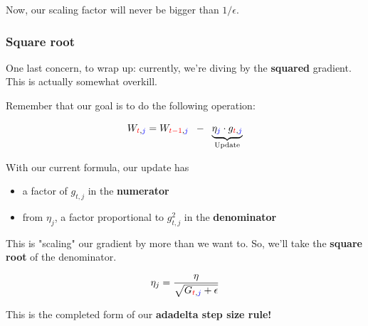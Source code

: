             Now, our scaling factor will never be bigger than $1/\epsilon$.

        \subsubsection{Square root}

            One last concern, to wrap up: currently, we're diving by the \textbf{squared} gradient. This is actually somewhat overkill. 
            
            Remember that our goal is to do the following operation:

            \begin{equation}
                W_{\textcolor{red}{t},\textcolor{blue}{j}} = W_{\textcolor{red}{t-1},\textcolor{blue}{j}}  \;\;-\;\; 
                \underbrace{
                    \eta_{\textcolor{blue}{j}} \cdot g_{\textcolor{red}{t},\textcolor{blue}{j}}
                }_{\text{Update}}
            \end{equation}

            With our current formula, our update has 
            
            \begin{itemize}
                \item a factor of $g_{t,j}$ in the \textbf{numerator}
                \item from $\eta_j$, a factor proportional to $g_{t,j}^2$ in the \textbf{denominator} 
            \end{itemize}

            This is "scaling" our gradient by more than we want to. So, we'll take the \textbf{square root} of the denominator.

            \begin{equation}
                \eta_j = \frac{\eta}{ \sqrt{G_{\textcolor{red}{t},\textcolor{blue}{j}}+\epsilon} }
            \end{equation}

            This is the completed form of our \textbf{adadelta step size rule!}

